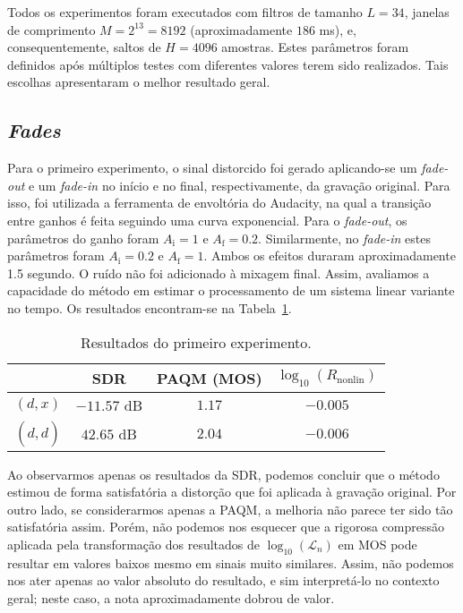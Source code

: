 Todos os experimentos foram executados com filtros de tamanho $L = 34$, janelas de comprimento $M = 2^{13} = 8192$ (aproximadamente $186$ ms), e, consequentemente, saltos de $H = 4096$ amostras. Estes parâmetros foram definidos após múltiplos testes com diferentes valores terem sido realizados. Tais escolhas apresentaram o melhor resultado geral.

\subsection{\textit{Fades}}

Para o primeiro experimento, o sinal distorcido foi gerado aplicando-se um \textit{fade-out} e um \textit{fade-in} no início e no final, respectivamente, da gravação original. Para isso, foi utilizada a ferramenta de envoltória do Audacity, na qual a transição entre ganhos é feita seguindo uma curva exponencial. Para o \textit{fade-out}, os parâmetros do ganho foram $A_\mathrm{i} = 1$ e $A_\mathrm{f} = 0.2$. Similarmente, no \textit{fade-in} estes parâmetros foram $A_\mathrm{i} = 0.2$ e $A_\mathrm{f} = 1$. Ambos os efeitos duraram aproximadamente 1.5 segundo. O ruído não foi adicionado à mixagem final. Assim, avaliamos a capacidade do método em estimar o processamento de um sistema linear variante no tempo. Os resultados encontram-se na Tabela~\ref{tab:wf:experiment-1}.
{\def\arraystretch{1.25}\tabcolsep=10pt
\begin{table}[!ht]
    \centering
    \caption[Resultados do primeiro experimento: \textit{fades}]{Resultados do primeiro experimento.}
    \label{tab:wf:experiment-1}
    \begin{tabular}{cccc}
        \toprule
                         & SDR        & PAQM (MOS)   & $\log_{10}(R_{\text{nonlin}})$ \\
        \midrule
        $(d, x)$       & $-11.57$ dB & $1.17$  & $-0.005$                 \\
        $(d, \hat{d})$ & $42.65$ dB & $2.04$   & $-0.006$                \\ \bottomrule
    \end{tabular}
\end{table}
}

Ao observarmos apenas os resultados da SDR, podemos concluir que o método estimou de forma satisfatória a distorção que foi aplicada à gravação original. Por outro lado, se considerarmos apenas a PAQM, a melhoria não parece ter sido tão satisfatória assim. Porém, não podemos nos esquecer que a rigorosa compressão aplicada pela transformação dos resultados de $\log_{10}(\mathcal{L}_n)$ em MOS pode resultar em valores baixos mesmo em sinais muito similares. Assim, não podemos nos ater apenas ao valor absoluto do resultado, e sim interpretá-lo no contexto geral; neste caso, a nota aproximadamente dobrou de valor.

